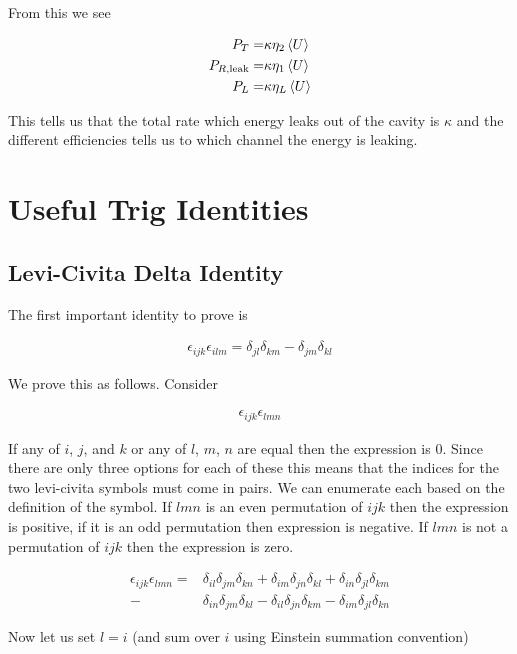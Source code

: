 \documentclass[12pt]{article}
\newcommand{\ep}{\epsilon}
\begin{document}
From this we see

\begin{align}
P_T =& \kappa \eta_2 \Braket{U}\\
P_{R,\text{leak}} =& \kappa \eta_1 \Braket{U}\\
P_L =& \kappa \eta_L \Braket{U}
\end{align}

This tells us that the total rate which energy leaks out of the cavity is $\kappa$ and the different efficiencies tells us to which channel the energy is leaking.

\section{Useful Trig Identities}

\subsection{Levi-Civita Delta Identity}
The first important identity to prove is 

\begin{align}
\ep_{ijk} \ep_{ilm} = \delta_{jl}\delta_{km} - \delta_{jm}\delta_{kl}
\end{align}

We prove this as follows.
Consider 

\begin{align}
\ep_{ijk}\ep_{lmn}
\end{align}

If any of $i$, $j$, and $k$ or any of $l$, $m$, $n$ are equal then the expression is 0.
Since there are only three options for each of these this means that the indices for the two levi-civita symbols must come in pairs.
We can enumerate each based on the definition of the symbol.
If $lmn$ is an even permutation of $ijk$ then the expression is positive, if it is an odd permutation then expression is negative.
If $lmn$ is not a permutation of $ijk$ then the expression is zero.

\begin{align}
\ep_{ijk}\ep_{lmn} = &\delta_{il}\delta_{jm}\delta_{kn} + \delta_{im}\delta_{jn}\delta_{kl} + \delta_{in}\delta_{jl}\delta_{km}\\
-&\delta_{in}\delta_{jm}\delta_{kl} - \delta_{il}\delta_{jn}\delta_{km} - \delta_{im}\delta_{jl}\delta_{kn}
\end{align}

Now let us set $l=i$ (and sum over $i$ using Einstein summation convention)
\end{document}
